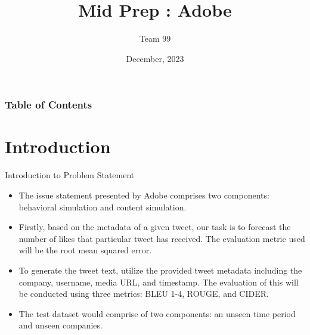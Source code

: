 \documentclass{beamer}
\title[Mid Prep : Adobe]
{Mid Prep : Adobe}
\author[Team 99] %
{Team 99}
\institute[] %
{
  
  Inter IIT TechMeet 12.0 \\
  
}
\date[Inter IIT Tech Meet] %
{December, 2023}
\begin{document}
\frame{\titlepage}

\begin{frame}
\frametitle{Table of Contents}

\tableofcontents
\end{frame}

\section{Introduction}

\begin{frame}{Introduction to Problem Statement}
\begin{itemize}
    \item The issue statement presented by Adobe comprises two components: behavioral simulation and content simulation.
    \item Firstly, based on the metadata of a given tweet, our task is to forecast the number of likes that particular tweet has received. The evaluation metric used will be the root mean squared error.
    \item To generate the tweet text, utilize the provided tweet metadata including the company, username, media URL, and timestamp. The evaluation of this will be conducted using three metrics: BLEU 1-4, ROUGE, and CIDER.
    \item The test dataset would comprise of two components: an unseen time period and unseen companies.
    
\end{itemize}

\end{frame}
\end{document}
